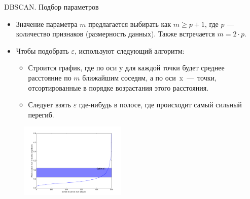 \documentclass[unicode, notheorems, handout]{beamer}
\begin{document}
\begin{frame}{DBSCAN. Подбор параметров}
\small
    \begin{itemize}
        \item Значение параметра $m$ предлагается выбирать как $m\geqslant p+1$, где $p$ --- количество признаков (размерность данных). Также встречается $m=2\cdot p$.
        \item Чтобы подобрать $\varepsilon$, используют следующий алгоритм:
        \footnotesize
        \begin{itemize}
             \item[\ding{87}]  Строится график, где по оси y для каждой точки будет среднее расстояние по $m$ ближайшим соседям, а по оси~x~---~точки, отсортированные в порядке возрастания этого расстояния. 
            \item[\ding{87}]  Следует взять $\varepsilon$ где-нибудь в полосе, где происходит самый сильный перегиб. 
        \end{itemize}
    \end{itemize}
\vspace{-2.5ex}

     \begin{figure}[h]
        \centering
        \includegraphics[width=0.45\textwidth]{dbscan_eps.png} 
    \end{figure}
                  
\end{frame}
\end{document}
